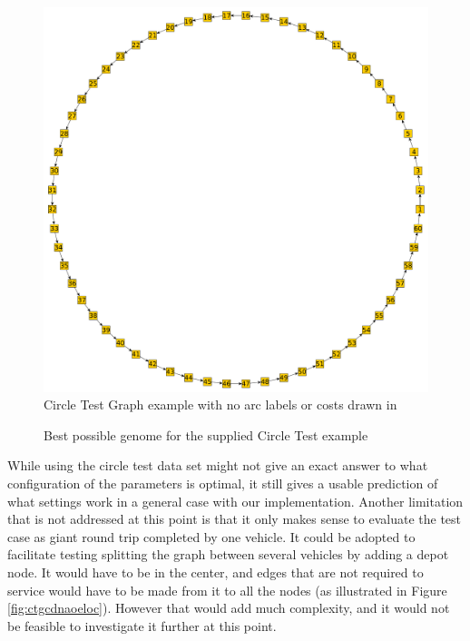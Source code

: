 \begin{figure}[H]
    \centerline{\includegraphics[width=\textwidth]{figures/CircleTests/CircleTestIllustrations/Circle_Test_Graph-No_arc_labels_or_costs.pdf}}
    \caption{Circle Test Graph example with no arc labels or costs drawn in}
    \label{fig:ctgnaloc}
\end{figure}

\begin{figure}[H]
    \noindent
    \caption{Best possible genome for the supplied Circle Test example}
    \label{fig:bpgftscte}
\end{figure}

While using the circle test data set might not give an exact answer to what configuration of the parameters is optimal, it still gives a usable prediction of what settings work in a general case with our implementation. Another limitation that is not addressed at this point is that it only makes sense to evaluate the test case as giant round trip completed by one vehicle. It could be adopted to facilitate testing splitting the graph between several vehicles by adding a depot node. It would have to be in the center, and edges that are not required to service would have to be made from it to all the nodes (as illustrated in Figure \ref{fig:ctgcdnaoeloc}). However that would add much complexity, and it would not be feasible to investigate it further at this point.

